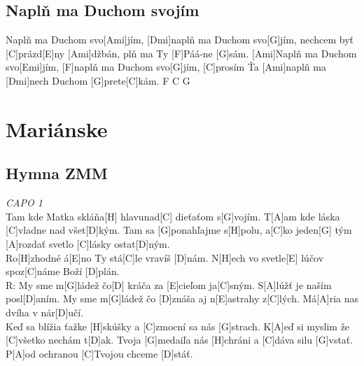 \documentclass[10pt]{article}
\begin{document}
\begin{Large}
\begin{minipage}{\textwidth}
\subsection{Naplň ma Duchom svojím}
\begin{guitar}
	[C]Naplň ma Duchom svo[Ami]jím, [Dmi]naplň ma Duchom svo[G]jím,
	nechcem byť [C]prázd[E]ny [Ami]džbán, plň ma Ty [F]Páá-ne [G]sám.
	[Ami]Naplň ma Duchom svo[Emi]jím, [F]naplň ma Duchom svo[G]jím,
	[C]prosím Ťa [Ami]naplň ma [Dmi]nech Duchom [G]prete[C]kám. F C G
\end{guitar}
\end{minipage}


\section{Mariánske}

\begin{minipage}{\textwidth}
\subsection{Hymna ZMM }
\begin{guitar}
	\textit{CAPO 1}\\
	[G]Tam kde Matka skláňa[H] hlavunad[C] dieťaťom s[G]vojím.
	T[A]am kde láska [C]vladne nad všet[D]kým.
	Tam sa [G]ponahľajme s[H]polu, a[C]ko jeden[G] tým
	[A]rozdať svetlo [C]lásky ostat[D]ným.
	\\
	Ro[H]zhodné á[E]no Ty stá[C]le vravíš [D]nám.
	N[H]ech vo svetle[E] lúčov spoz[C]náme Boží [D]plán.
	\\
	R: My sme m[G]ládež čo[D] kráča
	za [E]cieľom ja[C]sným.
	S[A]lúžť je naším posl[D]aním.
	My sme m[G]ládež čo [D]znáša 
	aj n[E]astrahy z[C]lých.
	Má[A]ria nas dvíha v nár[D]učí.
	\\
	[G]Keď sa blížia ťažke [H]skúšky a [C]zmocní sa nás [G]strach.
	K[A]eď si myslim že [C]všetko nechám t[D]ak.
	Tvoja [G]medaiľa nás [H]chráni a [C]dáva silu [G]vstať.
	P[A]od ochranou [C]Tvojou chceme [D]stáť.
\end{guitar}
\end{minipage}

\begin{minipage}{\textwidth}

\end{minipage}
\end{Large}
\end{document}
